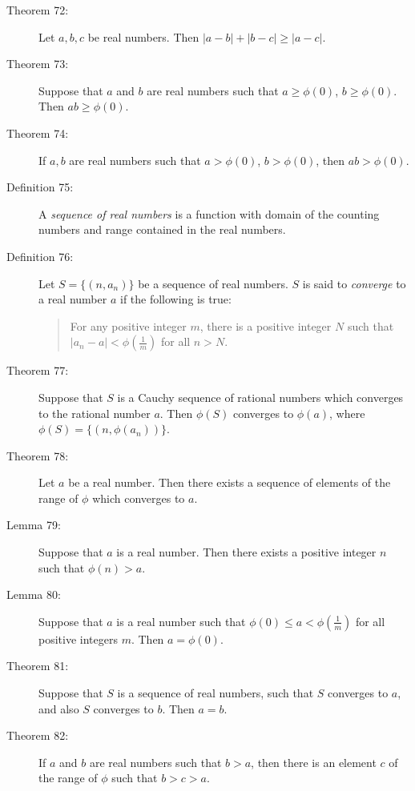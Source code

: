 \documentclass{article}
\begin{document}
\begin{description}
  \item[Theorem 72:] Let $a,b,c$ be real numbers. Then $|a-b| + |b-c| \geq |a-c|$.

  \item[Theorem 73:] Suppose that $a$ and $b$ are real numbers such that $a \geq \phi(0)$, $b \geq \phi(0)$. Then $ab \geq \phi(0)$.

  \item[Theorem 74:] If $a,b$ are real numbers such that $a > \phi(0)$, $b > \phi(0)$, then $ab > \phi(0)$.

  \item[Definition 75:] A \emph{sequence of real numbers} is a function with domain of the counting numbers and range contained in the real numbers.

  \item[Definition 76:] Let $S = \{ (n, a_{n}) \}$ be a sequence of real numbers. $S$ is said to \emph{converge} to a real number $a$ if the following is true: 
    \begin{quote}
    For any positive integer $m$, there is a positive integer $N$ such that $|a_{n}-a| < \phi \left( \frac{1}{m} \right)$ for all $n > N$.
    \end{quote}

  \item[Theorem 77:] Suppose that $S$ is a Cauchy sequence of rational numbers which converges to the rational number $a$. Then $\phi(S)$ converges to $\phi(a)$, where $\phi(S) = \{ ( n, \phi(a_{n}) ) \}$. 

  \item[Theorem 78:] Let $a$ be a real number. Then there exists a sequence of elements of the range of $\phi$ which converges to $a$. 

  \item[Lemma 79:] Suppose that $a$ is a real number. Then there exists a positive integer $n$ such that $\phi(n) > a$. 

  \item[Lemma 80:] Suppose that $a$ is a real number such that $\phi(0) \leq a < \phi \left( \frac{1}{m} \right)$ for all positive integers $m$. Then $a = \phi(0)$. 

  \item[Theorem 81:] Suppose that $S$ is a sequence of real numbers, such that $S$ converges to $a$, and also $S$ converges to $b$. Then $a=b$. 

  \item[Theorem 82:] If $a$ and $b$ are real numbers such that $b > a$, then there is an element $c$ of the range of $\phi$ such that $b > c > a$. 


\end{description}
\end{document}
